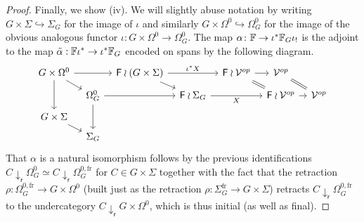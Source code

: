 \documentclass[a4paper,10pt]{article}%
\begin{document}
\begin{proof}
Finally, we show (iv). We will slightly abuse notation by writing 
$G \times \Sigma \hookrightarrow \Sigma_G$ for the image of $\iota$
and similarly
$G \times \Omega^0 \hookrightarrow \Omega_{G}^{0}$ for the image of the obvious analogous functor
$\iota \colon G \times \Omega^0 \to \Omega_{G}^{0}$.
The map 
$\alpha \colon \mathbb{F} \to \iota^{\**} \mathbb{F}_G \iota_{!}$
is the adjoint to the map 
$\tilde \alpha: \mathbb{F} \iota^{\**} \to \iota^{\**} \mathbb{F}_G$ encoded on spans by the following diagram.
\begin{equation}\label{MONADEQUIV DEF}
\begin{tikzcd}[row sep=5pt, column sep =8pt]
	G \times \Omega^0	\ar{dd} \ar{rd} \ar{rr} &&
	\Fin \wr (G \times \Sigma) \ar{rd}  \ar{rr}{\iota^{\**} X}&&
	\Fin \wr \mathcal{V}^{op} \ar{r} \ar[equal]{rd}&
	\mathcal{V}^{op} \ar[equal]{rd}
\\
	& \Omega_{G}^{0} \ar{dd} \ar{rr} &&
	\Fin \wr \Sigma_G  \ar{rr}[swap]{X} &&
	\Fin \wr \mathcal{V}^{op} \ar{r} &
	\mathcal{V}^{op}
\\
	G \times \Sigma \ar{rd} 
\\
	& \Sigma_G
\end{tikzcd}
\end{equation}
That 
$\alpha$
is a natural isomorphism
follows by the previous identifications 
$C \downarrow_{\mathsf{r}} \Omega_{G}^{0} \simeq
C \downarrow_{\mathsf{r}} \Omega_{G}^{0,\text{fr}}$
for $C \in G \times \Sigma$
together with the fact that the retraction 
$\rho \colon \Omega_{G}^{0,\text{fr}} \to G \times \Omega^0$
(built just as the retraction
$\rho \colon \Sigma_G^{\text{fr}} \to G \times \Sigma$)
retracts 
$C \downarrow_{\mathsf{r}} \Omega_{G}^{0,\text{fr}}$
to the undercategory
$C \downarrow_{\mathsf{r}} G \times \Omega^0$, which is thus initial (as well as final).


\end{proof}
\end{document}
